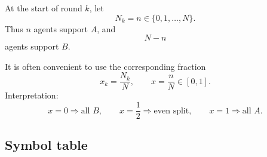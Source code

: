 \documentclass[11pt,a4paper]{article}
\newcommand{\1}{\mathbbm{1}}
\begin{document}
At the start of round $k$, let
\begin{equation}
N_k=n\in\{0,1,\ldots,N\}.
\end{equation}
Thus $n$ agents support $A$, and
\[
N-n
\]
agents support $B$.

It is often convenient to use the corresponding fraction
\begin{equation}
x_k=\frac{N_k}{N},\qquad x=\frac{n}{N}\in[0,1].
\end{equation}
Interpretation:
\[
x=0 \Rightarrow \text{all }B,\qquad
x=\frac12 \Rightarrow \text{even split},\qquad
x=1 \Rightarrow \text{all }A.
\]

\subsection{Symbol table}
\end{document}
